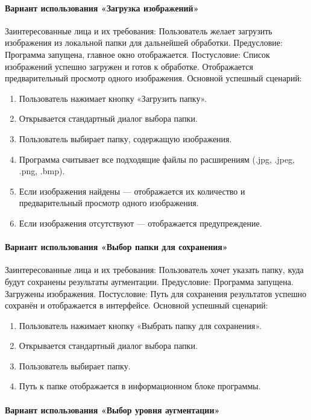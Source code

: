 \paragraph{Вариант использования «Загрузка изображений»}

Заинтересованные лица и их требования:
Пользователь желает загрузить изображения из локальной папки для дальнейшей обработки.
Предусловие:
Программа запущена, главное окно отображается.
Постусловие:
Список изображений успешно загружен и готов к обработке. Отображается предварительный просмотр одного изображения.
Основной успешный сценарий:
\begin{enumerate}
	\item Пользователь нажимает кнопку «Загрузить папку».
	\item Открывается стандартный диалог выбора папки.
	\item Пользователь выбирает папку, содержащую изображения.
	\item Программа считывает все подходящие файлы по расширениям (.jpg, .jpeg, .png, .bmp).
	\item Если изображения найдены — отображается их количество и предварительный просмотр одного изображения.
	\item Если изображения отсутствуют — отображается предупреждение.
\end{enumerate}

\paragraph{Вариант использования «Выбор папки для сохранения»}

Заинтересованные лица и их требования:
Пользователь хочет указать папку, куда будут сохранены результаты аугментации.
Предусловие:
Программа запущена. Загружены изображения.
Постусловие:
Путь для сохранения результатов успешно сохранён и отображается в интерфейсе.
Основной успешный сценарий:

\begin{enumerate}
	\item Пользователь нажимает кнопку «Выбрать папку для сохранения».
	\item Открывается стандартный диалог выбора папки.
	\item Пользователь выбирает папку.
	\item Путь к папке отображается в информационном блоке программы.
\end{enumerate}

\paragraph{Вариант использования «Выбор уровня аугментации»}

